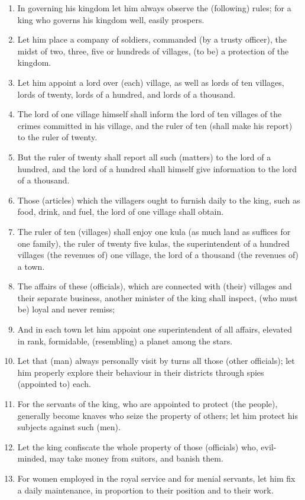 \begin{enumerate}
\item In governing his kingdom let him always observe the (following) rules; for a king who governs his kingdom well, easily prospers.
\item Let him place a company of soldiers, commanded (by a trusty officer), the midst of two, three, five or hundreds of villages, (to be) a protection of the kingdom.
\item Let him appoint a lord over (each) village, as well as lords of ten villages, lords of twenty, lords of a hundred, and lords of a thousand.
\item The lord of one village himself shall inform the lord of ten villages of the crimes committed in his village, and the ruler of ten (shall make his report) to the ruler of twenty.
\item But the ruler of twenty shall report all such (matters) to the lord of a hundred, and the lord of a hundred shall himself give information to the lord of a thousand.
\item Those (articles) which the villagers ought to furnish daily to the king, such as food, drink, and fuel, the lord of one village shall obtain.
\item The ruler of ten (villages) shall enjoy one kula (as much land as suffices for one family), the ruler of twenty five kulas, the superintendent of a hundred villages (the revenues of) one village, the lord of a thousand (the revenues of) a town.
\item The affairs of these (officials), which are connected with (their) villages and their separate business, another minister of the king shall inspect, (who must be) loyal and never remiss;
\item And in each town let him appoint one superintendent of all affairs, elevated in rank, formidable, (resembling) a planet among the stars.
\item Let that (man) always personally visit by turns all those (other officials); let him properly explore their behaviour in their districts through spies (appointed to) each.
\item For the servants of the king, who are appointed to protect (the people), generally become knaves who seize the property of others; let him protect his subjects against such (men).
\item Let the king confiscate the whole property of those (officials) who, evil-minded, may take money from suitors, and banish them.
\item For women employed in the royal service and for menial servants, let him fix a daily maintenance, in proportion to their position and to their work.

\end{enumerate}
